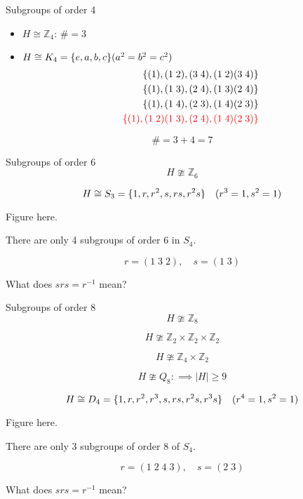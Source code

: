 \begin{frame}{Subgroups of order 4}
  \begin{itemize}
    \item $H \cong \mathbb{Z}_{4}$: $\# = 3$
    \item $H \cong K_{4} = \{e, a, b, c\} (a^2 = b^2 = c^2)$
    \begin{align*}
      \{(1), (1\; 2), (3\; 4), (1\; 2) (3\; 4)\}\\
      \{(1), (1\; 3), (2\; 4), (1\; 3) (2\; 4)\}\\
      \{(1), (1\; 4), (2\; 3), (1\; 4) (2\; 3)\}\\
      \textcolor{red}{\{(1), (1\; 2) (1\; 3), (2\; 4), (1\; 4) (2\; 3)\}}
    \end{align*}
  \end{itemize}

  \[
    \# = 3 + 4 = 7
  \]
\end{frame}
\begin{frame}{Subgroups of order 6}
  \[
    H \ncong \mathbb{Z}_{6}
  \]

  \[
    H \cong S_3 = \{1, r, r^2, s, rs, r^2s\} \quad (r^3 = 1, s^2 = 1)
  \]

  \centerline{Figure here.}

  \begin{theorem}
    There are only 4 subgroups of order 6 in $S_4$.
  \end{theorem}

  \[
    r = (1\;3\;2), \quad s = (1\;3)
  \]

  \centerline{What does $srs = r^{-1}$ mean?}
\end{frame}
\begin{frame}{Subgroups of order 8}
  \[
    H \ncong \mathbb{Z}_{8}
  \]

  \[
    H \ncong \mathbb{Z}_{2} \times \mathbb{Z}_{2} \times \mathbb{Z}_{2}
  \]

  \[
    H \ncong \mathbb{Z}_{4} \times \mathbb{Z}_{2}
  \]

  \[
    H \ncong Q_8: \implies |H| \ge 9
  \]

  \[
    H \cong D_4 = \{1, r, r^2, r^3, s, rs, r^2s, r^3s\} \quad (r^4 = 1, s^2 = 1)
  \]

  \centerline{Figure here.}

  \begin{theorem}
    There are only 3 subgroups of order 8 of $S_4$.
  \end{theorem}

  \[
    r = (1\;2\;4\;3), \quad s = (2\;3)
  \]

  \centerline{What does $srs = r^{-1}$ mean?}
\end{frame}

